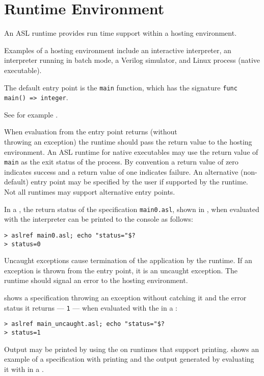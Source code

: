 \chapter{Runtime Environment\label{chap:RuntimeEnvironment}}

An ASL runtime provides run time support within a hosting environment.

Examples of a hosting environment include an interactive interpreter,
an interpreter running in batch mode,
a Verilog simulator, and Linux process (native executable).

The default entry point is the \texttt{main} function, which has the signature
\verb|func main() => integer|.

See for example .

When evaluation from the entry point returns (without \\
throwing an exception)
the runtime should pass the return value to the hosting environment.
%
An ASL runtime for native executables may use the return value
of \texttt{main} as the exit status of the process.
%
By convention a return value of zero indicates success and a return value of
one indicates failure.
%
An alternative (non-default) entry point may be specified by the user if
supported by the runtime. Not all runtimes may support alternative entry points.

In a \linuxbashshell{}, the return status of the specification \texttt{main0.asl},
shown in ,
when evaluated with the \aslref{}
interpreter can be printed to the console as follows:
\begin{Verbatim}[frame=single]
> aslref main0.asl; echo "status="$?
> status=0
\end{Verbatim}


Uncaught exceptions cause termination of the application by the runtime.
If an exception is thrown from the entry point, it is an uncaught exception.
The runtime should signal an error to the hosting environment.

 shows a specification throwing an exception
without catching it and the error status it returns --- \texttt{1} ---
when evaluated with the \aslref{} in a \linuxbashshell{}:
\begin{verbatim}
> aslref main_uncaught.asl; echo "status="$?
> status=1
\end{verbatim}


Output may be printed by using the \printstatementterm{} on
runtimes that support printing.
%
 shows an example of a specification
with printing and the output generated by evaluating it with \aslref{}
in a \linuxbashshell{}.

